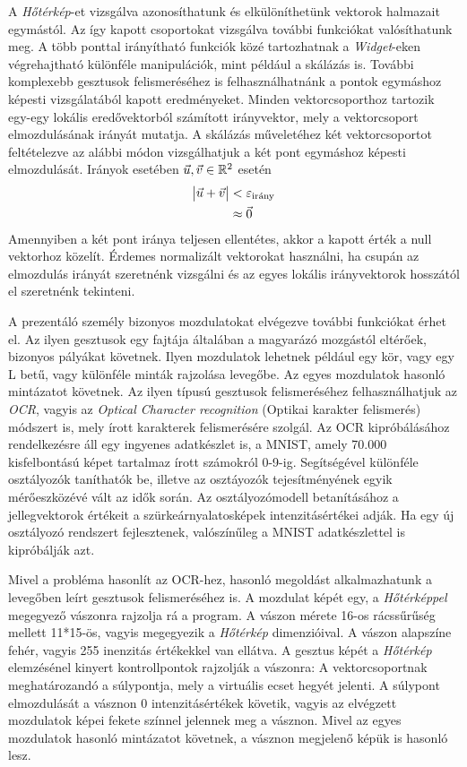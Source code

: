
A \textit{Hőtérkép}-et vizsgálva azonosíthatunk és elkülöníthetünk vektorok halmazait egymástól. Az így kapott csoportokat vizsgálva további funkciókat valósíthatunk meg. A több ponttal irányítható funkciók közé tartozhatnak a \textit{Widget}-eken végrehajtható különféle manipulációk, mint például a skálázás is. További komplexebb gesztusok felismeréséhez is felhasználhatnánk a pontok egymáshoz képesti vizsgálatából kapott eredményeket.
Minden vektorcsoporthoz tartozik egy-egy lokális eredővektorból számított irányvektor, mely a vektorcsoport elmozdulásának irányát mutatja.
A skálázás műveletéhez két vektorcsoportot feltételezve az alábbi módon vizsgálhatjuk a két pont egymáshoz képesti elmozdulását.
Irányok esetében $\vec{u},\vec{v}\in \Bbb R^2$ esetén
\begin{align*}
\vmatrix \vec{u}+\vec{v} \endvmatrix &< \varepsilon_{\text{irány}}\\
&\approx \vec{0}
\end{align*}
Amennyiben a két pont iránya teljesen ellentétes, akkor a kapott érték a null vektorhoz közelít. Érdemes normalizált vektorokat használni, ha csupán az elmozdulás irányát szeretnénk vizsgálni és az egyes lokális irányvektorok hosszától el szeretnénk tekinteni.


A prezentáló személy bizonyos mozdulatokat elvégezve további funkciókat érhet el. Az ilyen gesztusok egy fajtája általában a magyarázó mozgástól eltérőek, bizonyos pályákat követnek. Ilyen mozdulatok lehetnek például egy kör, vagy egy L betű, vagy különféle minták rajzolása levegőbe. Az egyes mozdulatok hasonló mintázatot követnek.
Az ilyen típusú gesztusok felismeréséhez felhasználhatjuk az \textit{OCR}, vagyis az \textit{Optical Character recognition} (Optikai karakter felismerés) módszert is, mely írott karakterek felismerésére szolgál. 
Az OCR kipróbálásához rendelkezésre áll egy ingyenes adatkészlet is, a MNIST, amely 70.000 kisfelbontású képet tartalmaz írott számokról 0-9-ig. Segítségével különféle osztályozók taníthatók be, illetve az osztáyozók tejesítményének egyik mérőeszközévé vált az idők során. Az osztályozómodell betanításához a jellegvektorok értékeit a szürkeárnyalatosképek intenzitásértékei adják. Ha egy új osztályozó rendszert fejlesztenek, valószínűleg a MNIST adatkészlettel is kipróbálják azt. \cite{geron2019hands}

Mivel a probléma hasonlít az OCR-hez, hasonló megoldást alkalmazhatunk a levegőben leírt gesztusok felismeréséhez is. A mozdulat képét egy, a \textit{Hőtérképpel} megegyező vászonra rajzolja rá a program. A vászon mérete 16-os rácssűrűség mellett 11*15-ös, vagyis megegyezik a \textit{Hőtérkép} dimenzióival. A vászon alapszíne fehér, vagyis 255 inenzitás értékekkel van ellátva. A gesztus képét a \textit{Hőtérkép} elemzésénel kinyert kontrollpontok rajzolják a vászonra: A vektorcsoportnak meghatározandó a súlypontja, mely a virtuális ecset hegyét jelenti. A súlypont elmozdulását a vásznon 0 intenzitásértékek követik, vagyis az elvégzett mozdulatok képei fekete színnel jelennek meg a vásznon. Mivel az egyes mozdulatok hasonló mintázatot követnek, a vásznon megjelenő képük is hasonló lesz.

